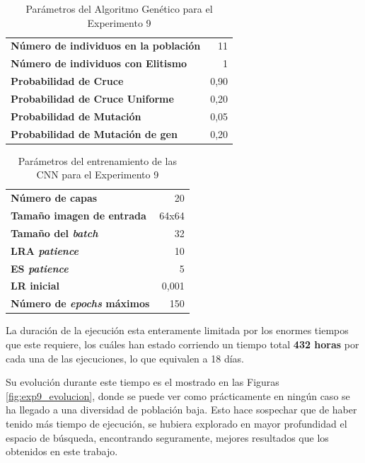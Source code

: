 \begin{table}[!h]
\caption{Parámetros del Algoritmo Genético para el Experimento 9}
\label{tab:exp9_par_ag}
\centering
\begin{tabular}{l|r}
\toprule
\textbf{Número de individuos en la población} & 11   \\
\textbf{Número de individuos con Elitismo}    & 1    \\
\textbf{Probabilidad de Cruce }               & 0,90 \\
\textbf{Probabilidad de Cruce Uniforme }      & 0,20 \\
\textbf{Probabilidad de Mutación}             & 0,05 \\
\textbf{Probabilidad de Mutación de gen}      & 0,20 \\
\bottomrule
\end{tabular}
\end{table}

\vspace*{1.5 cm}

\begin{table}[!h]
\caption{Parámetros del entrenamiento de las CNN para el Experimento 9}
\label{tab:exp9_par_cnn}
\centering
\begin{tabular}{l|r}
\toprule 
\textbf{Número de capas}          & 20    \\
\textbf{Tamaño imagen de entrada} & 64x64 \\
\textbf{Tamaño del \textit{batch}}         & 32    \\
\textbf{LRA \textit{patience}}             & 10    \\
\textbf{ES \textit{patience}}              & 5     \\
\textbf{LR inicial}               & 0,001 \\
\textbf{Número de \textit{epochs} máximos}           & 150  \\
\bottomrule
\end{tabular}
\end{table}

La duración de la ejecución esta enteramente limitada por los enormes tiempos que este requiere, los cuáles han estado corriendo un tiempo total \textbf{432 horas} por cada una de las ejecuciones, lo que equivalen a 18 días. 

Su evolución durante este tiempo es el mostrado en las Figuras \ref{fig:exp9_evolucion}, donde se puede ver como prácticamente en ningún caso se ha llegado a una diversidad de población baja. Esto hace sospechar que de haber tenido más tiempo de ejecución, se hubiera explorado en mayor profundidad el espacio de búsqueda, encontrando seguramente, mejores resultados que los obtenidos en este trabajo.


